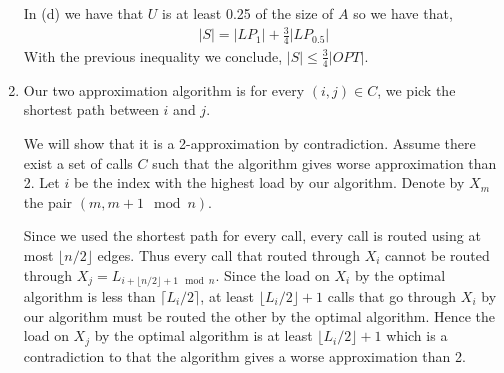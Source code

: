 \documentclass{article}
\begin{document}
\begin{enumerate}
In (d) we have that $U$ is at least 0.25 of the size of $A$ so we have that,
\begin{align*}
|S| = |LP_1| + \frac{3}{4} |LP_{0.5}|
\end{align*} 
With the previous inequality we conclude, $|S|\le \frac{3}{4} |OPT|$.

\item 
Our two approximation algorithm is for every $(i, j) \in C$, we pick the shortest path between $i$ and $j$.

We will show that it is a 2-approximation by contradiction.
Assume there exist a set of calls $C$ such that the algorithm gives worse approximation than 2.
Let $i$ be the index with the highest load by our algorithm. Denote by $X_m$ the pair $(m, m + 1\mod n)$.

Since we used the shortest path for every call, every call is routed using at most $\lfloor n/2 \rfloor$ edges. Thus every call that routed through $X_{i}$ cannot be routed through $X_j = L_{i + \lfloor n/2 \rfloor + 1 \mod n}$. Since the load on $X_i$ by the optimal algorithm is less than $\lceil L_i / 2\rceil$, at least $\lfloor L_i / 2 \rfloor + 1$ calls that go through $X_i$ by our algorithm must be routed the other by the optimal algorithm. Hence the load on $X_j$ by the optimal algorithm is at least $\lfloor L_i / 2 \rfloor +1$ which is a contradiction to that the algorithm gives a worse approximation than 2.

\end{enumerate}
\end{document}
